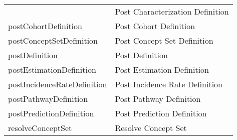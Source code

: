 \documentclass[
]{article}
\begin{document}
\begin{longtable}[]{@{}ll@{}}
\begin{minipage}[t]{0.46\columnwidth}
\end{minipage} & \begin{minipage}[t]{0.48\columnwidth}\raggedright
Post Characterization Definition\strut
\end{minipage}\tabularnewline
\begin{minipage}[t]{0.46\columnwidth}\raggedright
postCohortDefinition\strut
\end{minipage} & \begin{minipage}[t]{0.48\columnwidth}\raggedright
Post Cohort Definition\strut
\end{minipage}\tabularnewline
\begin{minipage}[t]{0.46\columnwidth}\raggedright
postConceptSetDefinition\strut
\end{minipage} & \begin{minipage}[t]{0.48\columnwidth}\raggedright
Post Concept Set Definition\strut
\end{minipage}\tabularnewline
\begin{minipage}[t]{0.46\columnwidth}\raggedright
postDefinition\strut
\end{minipage} & \begin{minipage}[t]{0.48\columnwidth}\raggedright
Post Definition\strut
\end{minipage}\tabularnewline
\begin{minipage}[t]{0.46\columnwidth}\raggedright
postEstimationDefinition\strut
\end{minipage} & \begin{minipage}[t]{0.48\columnwidth}\raggedright
Post Estimation Definition\strut
\end{minipage}\tabularnewline
\begin{minipage}[t]{0.46\columnwidth}\raggedright
postIncidenceRateDefinition\strut
\end{minipage} & \begin{minipage}[t]{0.48\columnwidth}\raggedright
Post Incidence Rate Definition\strut
\end{minipage}\tabularnewline
\begin{minipage}[t]{0.46\columnwidth}\raggedright
postPathwayDefinition\strut
\end{minipage} & \begin{minipage}[t]{0.48\columnwidth}\raggedright
Post Pathway Definition\strut
\end{minipage}\tabularnewline
\begin{minipage}[t]{0.46\columnwidth}\raggedright
postPredictionDefinition\strut
\end{minipage} & \begin{minipage}[t]{0.48\columnwidth}\raggedright
Post Prediction Definition\strut
\end{minipage}\tabularnewline
\begin{minipage}[t]{0.46\columnwidth}\raggedright
resolveConceptSet\strut
\end{minipage} & \begin{minipage}[t]{0.48\columnwidth}\raggedright
Resolve Concept Set\strut
\end{minipage}\tabularnewline
\bottomrule
\end{longtable}
\end{document}
